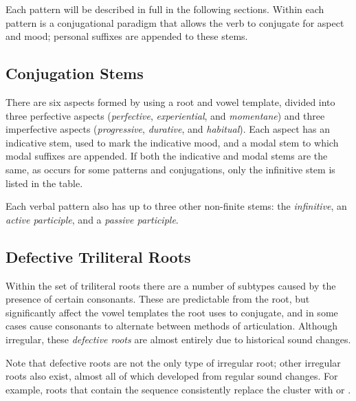 \documentclass[grammar]{subfiles}
\begin{document}
%        

%        


Each pattern will be described in full in the following sections.  Within each
pattern is a conjugational paradigm that allows the verb to conjugate for
aspect and mood; personal suffixes are appended to these stems.


\subsection{Conjugation Stems}
\label{sssec:vm_conjugation}

There are six aspects formed by using a root and vowel template, divided into
three perfective aspects (\emph{perfective}, \emph{experiential}, and
\emph{momentane}) and three imperfective aspects (\emph{progressive},
\emph{durative}, and \emph{habitual}).  Each aspect has an indicative stem,
used to mark the indicative mood, and a modal stem to which modal suffixes are
appended.  If both the indicative and modal stems are the same, as occurs for
some patterns and conjugations, only the infinitive stem is listed in the
table. 

Each verbal pattern also has up to three other non-finite stems: the
\emph{infinitive}, an \emph{active participle}, and a \emph{passive participle}.  


\subsection{Defective Triliteral Roots}
\label{ssec:vm_defective_roots}

Within the set of triliteral roots there are a number of subtypes caused by
the presence of certain consonants.  These are predictable from the root, but
significantly affect the vowel templates the root uses to conjugate, and in
some cases cause consonants to alternate between methods of articulation.
Although irregular, these \emph{defective roots} are almost entirely due to
historical sound changes. 

Note that defective roots are not the only type of irregular root; other
irregular roots also exist, almost all of which developed from regular sound
changes.  For example, roots that contain the sequence  consistently
replace the cluster  with  or .
\end{document}
